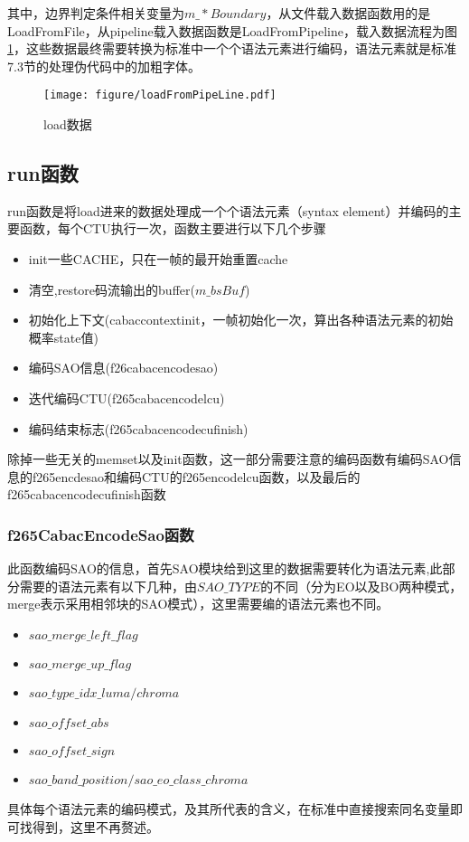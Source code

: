 \documentclass[UTF8,a4paper,12pt]{ctexart}
\begin{document}
其中，边界判定条件相关变量为$m\_*Boundary$，从文件载入数据函数用的是LoadFromFile，从pipeline载入数据函数是LoadFromPipeline，载入数据流程为图\ref{fig2}，这些数据最终需要转换为标准中一个个语法元素进行编码，语法元素就是标准7.3节的处理伪代码中的加粗字体。
\begin{figure}[H]
\centering
\texttt{[image: figure/loadFromPipeLine.pdf]}
\caption{load数据}\label{fig2}
\end{figure}

\subsection{run函数}
run函数是将load进来的数据处理成一个个语法元素（syntax element）并编码的主要函数，每个CTU执行一次，函数主要进行以下几个步骤
\begin{itemize}[itemindent=25pt]
\item [1)] init一些CACHE，只在一帧的最开始重置cache
\item [2)] 清空,restore码流输出的buffer($m\_bsBuf$)
\item [3)] 初始化上下文(cabaccontextinit，一帧初始化一次，算出各种语法元素的初始概率state值)
\item [4)] 编码SAO信息(f26cabacencodesao)
\item [5)] 迭代编码CTU(f265cabacencodelcu)
\item [6)] 编码结束标志(f265cabacencodecufinish)
\end{itemize}
除掉一些无关的memset以及init函数，这一部分需要注意的编码函数有编码SAO信息的f265encdesao和编码CTU的f265encodelcu函数，以及最后的f265cabacencodecufinish函数

\subsubsection{f265CabacEncodeSao函数}
此函数编码SAO的信息，首先SAO模块给到这里的数据需要转化为语法元素,此部分需要的语法元素有以下几种，由$SAO\_TYPE$的不同（分为EO以及BO两种模式，merge表示采用相邻块的SAO模式），这里需要编的语法元素也不同。
\begin{itemize}[itemindent=25pt]
\item [*)] $sao\_merge\_left\_flag$
\item [*)] $sao\_merge\_up\_flag$
\item [*)] $sao\_type\_idx\_luma/chroma$
\item [*)] $sao\_offset\_abs$
\item [*)] $sao\_offset\_sign$
\item [*)] $sao\_band\_position/sao\_eo\_class\_chroma$
\end{itemize}
具体每个语法元素的编码模式，及其所代表的含义，在标准中直接搜索同名变量即可找得到，这里不再赘述。
\end{document}
